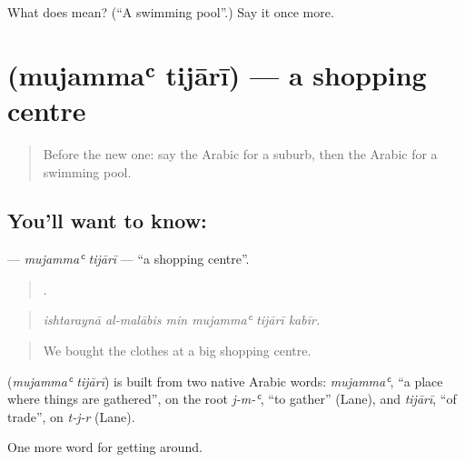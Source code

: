 \begin{tcolorbox}[breakable,colback=teal!4,colframe=teal!35!black,title={Before you move on}]
What does  mean? (\textquotedblleft{}A swimming pool\textquotedblright{}.) Say it once more.
\end{tcolorbox}
\section[\texorpdfstring{\ar{مجمع} \ar{تجاري} (mujammaʿ tijārī)}{مجمع تجاري (mujammaʿ tijārī)}]{  (mujammaʿ tijārī) — a shopping centre}

\label{lesson:AR-C454-mujammaa-tijari}



\begin{quote}
Before the new one: say the Arabic for a suburb, then the Arabic for a swimming pool.
\end{quote}

\subsection*{You'll want to know:  }
\textbf{ } — \emph{mujammaʿ tijārī} — \textquotedblleft{}a shopping centre\textquotedblright{}.

\begin{quote}
     .
\end{quote}

\begin{quote}
\emph{ishtaraynā al-malābis min mujammaʿ tijārī kabīr.}
\end{quote}

\begin{quote}
We bought the clothes at a big shopping centre.
\end{quote}

\begin{cousinweb}
\textbf{ } (\emph{mujammaʿ tijārī}) is built from two native Arabic words: \emph{mujammaʿ}, \textquotedblleft{}a place where things are gathered\textquotedblright{}, on the root \emph{j-m-ʿ}, \textquotedblleft{}to gather\textquotedblright{} (Lane), and \emph{tijārī}, \textquotedblleft{}of trade\textquotedblright{}, on \emph{t-j-r} (Lane).
\end{cousinweb}

\begin{grammarlens}[title={What you've built}]
One more word for getting around.
\end{grammarlens}

